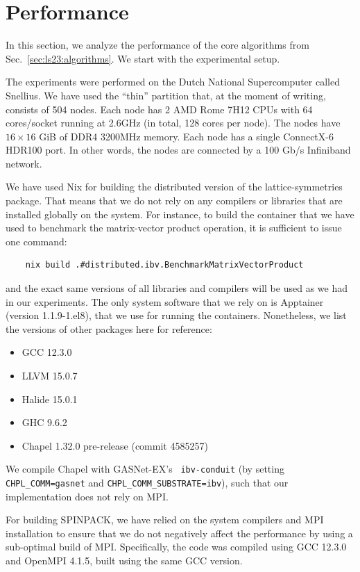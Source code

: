 \section{Performance}\label{sec:ls23:performance}

In this section, we analyze the performance of the core algorithms from Sec.~\ref{sec:ls23:algorithms}. We start with the experimental setup.

The experiments were performed on the Dutch National Supercomputer called Snellius. We have used the ``thin'' partition that, at the moment of writing, consists of 504 nodes. Each node has 2 AMD Rome 7H12 CPUs with 64 cores/socket running at 2.6GHz (in total, 128 cores per node). The nodes have $16\times 16$ GiB of DDR4 3200MHz memory. Each node has a single ConnectX-6 HDR100 port. In other words, the nodes are connected by a 100 Gb/s Infiniband network.

We have used Nix for building the distributed version of the lattice-symmetries package. That means that we do not rely on any compilers or libraries that are installed globally on the system. For instance, to build the container that we have used to benchmark the matrix-vector product operation, it is sufficient to issue one command:
\begin{verbatim}
    nix build .#distributed.ibv.BenchmarkMatrixVectorProduct
\end{verbatim}
and the exact same versions of all libraries and compilers will be used as we had in our experiments. The only system software that we rely on is Apptainer (version 1.1.9-1.el8), that we use for running the containers. Nonetheless, we list the versions of other packages here for reference:

\begin{itemize}[noitemsep]
	\item GCC 12.3.0
	\item LLVM 15.0.7
	\item Halide 15.0.1
	\item GHC 9.6.2
	\item Chapel 1.32.0 pre-release (commit 4585257)
\end{itemize}
We compile Chapel with GASNet-EX's~\cite{Bonach2018GasnetExAHi} \verb|ibv-conduit| (by setting \verb|CHPL_COMM=gasnet| and \verb|CHPL_COMM_SUBSTRATE=ibv|), such that our implementation does not rely on MPI.

For building SPINPACK, we have relied on the system compilers and MPI installation to ensure that we do not negatively affect the performance by using a sub-optimal build of MPI. Specifically, the code was compiled using GCC 12.3.0 and OpenMPI 4.1.5, built using the same GCC version.

